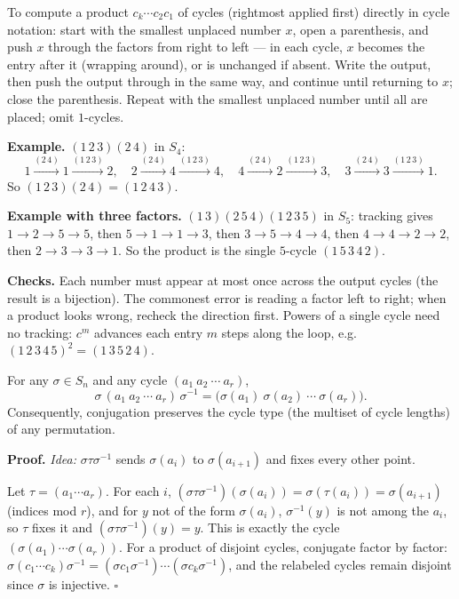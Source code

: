 \documentclass[11pt]{report}
\renewenvironment{proof}[1][Proof]{\noindent\textbf{#1.} }{\hfill$\square$\par\vspace{5pt}}
\begin{document}
\begin{exbox}\label{ex:multiplying-cycles-tracking-algorithm}
To compute a product $c_k \cdots c_2 c_1$ of cycles (rightmost applied first) directly in cycle notation: start with the smallest unplaced number $x$, open a parenthesis, and push $x$ through the factors from right to left --- in each cycle, $x$ becomes the entry after it (wrapping around), or is unchanged if absent. Write the output, then push the output through in the same way, and continue until returning to $x$; close the parenthesis. Repeat with the smallest unplaced number until all are placed; omit $1$-cycles.

\textbf{Example.} $(1\,2\,3)(2\,4)$ in $S_4$:
\[ 1 \xrightarrow{(2\,4)} 1 \xrightarrow{(1\,2\,3)} 2, \quad
   2 \xrightarrow{(2\,4)} 4 \xrightarrow{(1\,2\,3)} 4, \quad
   4 \xrightarrow{(2\,4)} 2 \xrightarrow{(1\,2\,3)} 3, \quad
   3 \xrightarrow{(2\,4)} 3 \xrightarrow{(1\,2\,3)} 1. \]
So $(1\,2\,3)(2\,4) = (1\,2\,4\,3)$.

\textbf{Example with three factors.} $(1\,3)(2\,5\,4)(1\,2\,3\,5)$ in $S_5$: tracking gives $1 \to 2 \to 5 \to 5$, then $5 \to 1 \to 1 \to 3$, then $3 \to 5 \to 4 \to 4$, then $4 \to 4 \to 2 \to 2$, then $2 \to 3 \to 3 \to 1$. So the product is the single $5$-cycle $(1\,5\,3\,4\,2)$.

\textbf{Checks.} Each number must appear at most once across the output cycles (the result is a bijection). The commonest error is reading a factor left to right; when a product looks wrong, recheck the direction first. Powers of a single cycle need no tracking: $c^m$ advances each entry $m$ steps along the loop, e.g.\ $(1\,2\,3\,4\,5)^2 = (1\,3\,5\,2\,4)$.
\end{exbox}

\begin{propbox}\label{prop:conjugation-relabels-cycle}
For any $\sigma \in S_n$ and any cycle $(a_1\ a_2\ \cdots\ a_r)$,
\[ \sigma\,(a_1\ a_2\ \cdots\ a_r)\,\sigma^{-1} = \big(\sigma(a_1)\ \sigma(a_2)\ \cdots\ \sigma(a_r)\big). \]
Consequently, conjugation preserves the cycle type (the multiset of cycle lengths) of any permutation.
\end{propbox}

\begin{proof}
\textit{Idea:} $\sigma\tau\sigma^{-1}$ sends $\sigma(a_i)$ to $\sigma(a_{i+1})$ and fixes every other point.\par
Let $\tau = (a_1 \cdots a_r)$. For each $i$, $(\sigma\tau\sigma^{-1})(\sigma(a_i)) = \sigma(\tau(a_i)) = \sigma(a_{i+1})$ (indices mod $r$), and for $y$ not of the form $\sigma(a_i)$, $\sigma^{-1}(y)$ is not among the $a_i$, so $\tau$ fixes it and $(\sigma\tau\sigma^{-1})(y) = y$. This is exactly the cycle $(\sigma(a_1) \cdots \sigma(a_r))$. For a product of disjoint cycles, conjugate factor by factor: $\sigma (c_1 \cdots c_k) \sigma^{-1} = (\sigma c_1 \sigma^{-1}) \cdots (\sigma c_k \sigma^{-1})$, and the relabeled cycles remain disjoint since $\sigma$ is injective.
\end{proof}
\end{document}
